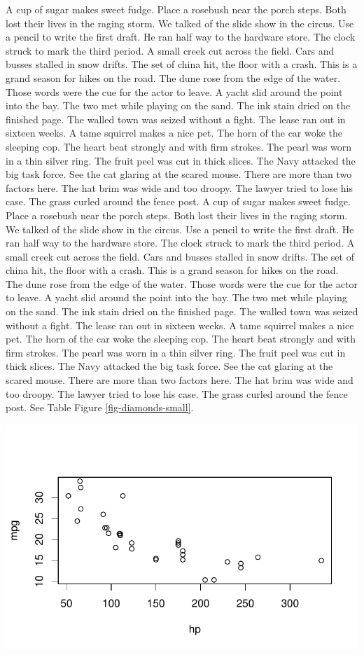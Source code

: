 \documentclass[
  letterpaper,
  DIV=11,
  numbers=noendperiod]{scrartcl}
\begin{document}
A cup of sugar makes sweet fudge. Place a rosebush near the porch steps.
Both lost their lives in the raging storm. We talked of the slide show
in the circus. Use a pencil to write the first draft. He ran half way to
the hardware store. The clock struck to mark the third period. A small
creek cut across the field. Cars and busses stalled in snow drifts. The
set of china hit, the floor with a crash. This is a grand season for
hikes on the road. The dune rose from the edge of the water. Those words
were the cue for the actor to leave. A yacht slid around the point into
the bay. The two met while playing on the sand. The ink stain dried on
the finished page. The walled town was seized without a fight. The lease
ran out in sixteen weeks. A tame squirrel makes a nice pet. The horn of
the car woke the sleeping cop. The heart beat strongly and with firm
strokes. The pearl was worn in a thin silver ring. The fruit peel was
cut in thick slices. The Navy attacked the big task force. See the cat
glaring at the scared mouse. There are more than two factors here. The
hat brim was wide and too droopy. The lawyer tried to lose his case. The
grass curled around the fence post. A cup of sugar makes sweet fudge.
Place a rosebush near the porch steps. Both lost their lives in the
raging storm. We talked of the slide show in the circus. Use a pencil to
write the first draft. He ran half way to the hardware store. The clock
struck to mark the third period. A small creek cut across the field.
Cars and busses stalled in snow drifts. The set of china hit, the floor
with a crash. This is a grand season for hikes on the road. The dune
rose from the edge of the water. Those words were the cue for the actor
to leave. A yacht slid around the point into the bay. The two met while
playing on the sand. The ink stain dried on the finished page. The
walled town was seized without a fight. The lease ran out in sixteen
weeks. A tame squirrel makes a nice pet. The horn of the car woke the
sleeping cop. The heart beat strongly and with firm strokes. The pearl
was worn in a thin silver ring. The fruit peel was cut in thick slices.
The Navy attacked the big task force. See the cat glaring at the scared
mouse. There are more than two factors here. The hat brim was wide and
too droopy. The lawyer tried to lose his case. The grass curled around
the fence post. See Table Figure \ref{fig-diamonds-small}.

\includegraphics{man_files/figure-pdf/unnamed-chunk-7-1.pdf}
\end{document}
